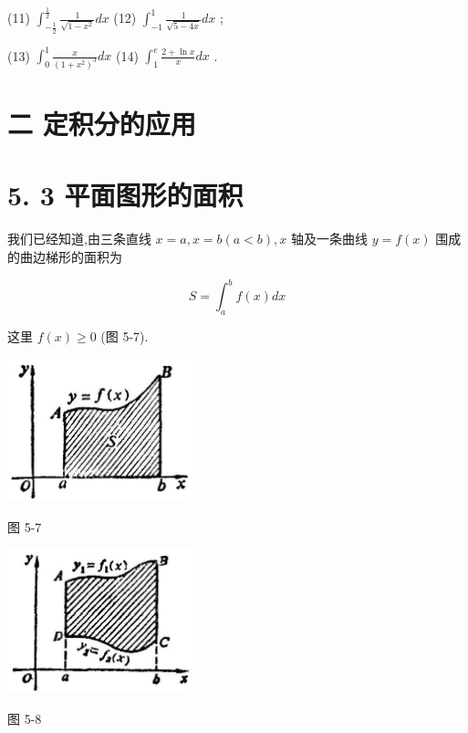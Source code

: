 \documentclass[10pt]{article}
\begin{document}
(11) \({\int }_{-\frac{1}{2}}^{\frac{1}{2}}\frac{1}{\sqrt{1 - {x}^{2}}}{dx}\) (12) \({\int }_{-1}^{1}\frac{1}{\sqrt{5 - {4x}}}{dx}\) ;

(13) \({\int }_{0}^{1}\frac{x}{{\left( 1 + {x}^{2}\right) }^{3}}{dx}\) (14) \({\int }_{1}^{e}\frac{2 + \ln x}{x}{dx}\) .

\section*{二 定积分的应用}

\section*{5. 3 平面图形的面积}

我们已经知道,由三条直线 \(x = a,x = b\left( {a < b}\right) ,x\) 轴及一条曲线 \(y = f\left( x\right)\) 围成的曲边梯形的面积为

\[
S = {\int }_{a}^{b}f\left( x\right) {dx}
\]

这里 \(f\left( x\right) \geq 0\) (图 5-7).

\begin{center}
\includegraphics[max width=0.4\textwidth]{images/01912c18-5c3f-733d-b775-749ba9897a9d_232_528761.jpg}
\end{center}

图 5-7

\begin{center}
\includegraphics[max width=0.4\textwidth]{images/01912c18-5c3f-733d-b775-749ba9897a9d_232_995714.jpg}
\end{center}

图 5-8
\end{document}
